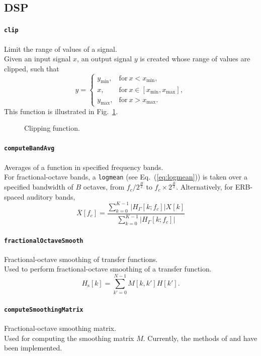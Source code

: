 \documentclass[11pt, oneside]{article}
\newcommand{\figref}[1]{Fig.~\ref{#1}}
\newcommand{\eqnref}[1]{Eq.~(\ref{#1})}
\newcommand{\function}[1]{\paragraph*{\texttt{#1}}}
\begin{document}
\subsection{DSP}

\function{clip} Limit the range of values of a signal. \\
Given an input signal $x$, an output signal $y$ is created whose range of values are clipped, such that
\begin{equation}
y =
\begin{cases}
y_\text{min}, & \text{for}~x < x_\text{min}, \\
x, & \text{for}~x \in [x_\text{min}, x_\text{max}], \\
y_\text{max}, & \text{for}~x > x_\text{max}.
\end{cases}
\end{equation}
This function is illustrated in \figref{fig:clip}.

\begin{figure}
\centering

\caption{Clipping function.}\label{fig:clip}
\end{figure}

\function{computeBandAvg} Averages of a function in specified frequency bands. \\
For fractional-octave bands, a \texttt{logmean} (see \eqnref{eq:logmean}) is taken over a specified bandwidth of $B$ octaves, from $f_c / 2^{\frac{B}{2}}$ to $f_c \times 2^{\frac{B}{2}}$.
Alternatively, for ERB-spaced auditory bands,
\begin{equation}
\overline{X}[f_c] = \frac{\displaystyle \sum_{k=0}^{K-1} \left| H_\Gamma[k;f_c] \right| X[k]}{\displaystyle \sum_{k=0}^{K-1} \left| H_\Gamma[k;f_c] \right|}
\end{equation}

\function{fractionalOctaveSmooth} Fractional-octave smoothing of transfer functions. \\
Used to perform fractional-octave smoothing of a transfer function.
\begin{equation}\label{eq:fractionalOctaveSmooth}
H_\text{s}[k] = \sum_{k' = 0}^{N - 1} M[k, k'] H[k'].
\end{equation}

\function{computeSmoothingMatrix} Fractional-octave smoothing matrix. \\
Used for computing the smoothing matrix $M$.
Currently, the methods of \citet{HatziantoniouMourjopoulos2000} and \citet{Tylka2017} have been implemented.
\end{document}
